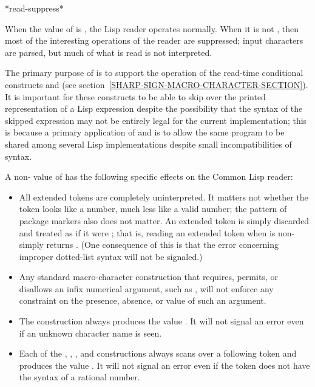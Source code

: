 \begin{defun}[Variable]
*read-suppress*

When the value of  is {\nil}, the Lisp reader
operates normally.  When it is not {\nil}, then most of the interesting
operations of the reader are suppressed; input characters are parsed,
but much of what is read is not interpreted.

The primary purpose of  is to support the operation of
the read-time conditional constructs \cd{\#+} and \cd{\#-}
(see section~\ref{SHARP-SIGN-MACRO-CHARACTER-SECTION}).  It is important for these
constructs to be able to skip over the printed representation of a Lisp
expression despite the possibility that the syntax of the skipped
expression may not be entirely legal for the current implementation; this
is because a primary application of \cd{\#+} and \cd{\#-} is to allow the
same program to be shared among several Lisp implementations despite
small incompatibilities of syntax.

A non-{\nil} value of  has the following specific
effects on the Common Lisp reader:
\begin{itemize}
\item
All extended tokens are completely uninterpreted.  It matters not
whether the token looks like a number, much less like a valid number;
the pattern of package markers also does not matter.  An extended token
is simply discarded and treated as if it were {\nil}; that is, reading
an extended token when  is non-{\nil} simply returns {\nil}.
(One consequence of this is that the error concerning improper
dotted-list syntax will not be signaled.)

\item
Any standard
\cd{\#} macro-character construction that requires, permits, or disallows
an infix numerical argument, such as , will not enforce
any constraint on the presence, absence, or value of such an argument.

\item
The \cd{\#{\Xbackslash}} construction always produces the value {\nil}.
It will not signal an error even if an unknown character name is seen.

\item
Each of the , , , and 
constructions always scans over a following token and produces the value {\nil}.
It will not signal an error even if the token does not have the syntax
of a rational number.


\end{itemize}
\end{defun}
